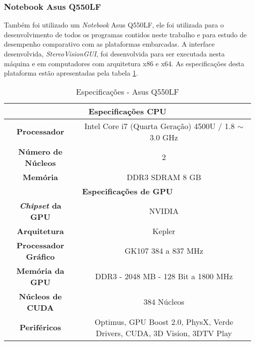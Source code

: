 \subsubsection{Notebook Asus Q550LF}

Também foi utilizado um \textit{Notebook} Asus Q550LF, ele foi utilizada para o desenvolvimento de todos os programas contidos neste trabalho e para estudo de desempenho comparativo com as plataformas embarcadas. A interface desenvolvida, \textit{StereoVisionGUI}, foi desenvolvida para ser executada nesta máquina e em computadores com arquitetura x86 e x64. As especificações desta plataforma estão apresentadas pela tabela \ref{asusQ550LF}.

\begin{table}[h]
\centering
\caption{Especificações - Asus Q550LF}
\label{asusQ550LF}
\begin{tabular}{|c|c|}
\hline
\multicolumn{2}{|c|}{\textbf{Especificações CPU}}                                                      		   \\ \hline
\textbf{Processador}             	& Intel Core i7 (Quarta Geração) 4500U / 1.8 $\sim$ 3.0 GHz           	   \\ \hline
\textbf{Número de Núcleos} 		& 2  	                                                                   \\ \hline
\textbf{Memória}          		& DDR3 SDRAM 8 GB                                                          \\ \hline
\multicolumn{2}{|c|}{\textbf{Especificações de GPU}}                                                   		   \\ \hline
\textbf{\textit{Chipset} da GPU}        & NVIDIA                                                      		   \\ \hline
\textbf{Arquitetura}    		& Kepler                                                                   \\ \hline
\textbf{Processador Gráfico}            & GK107 384 a 837 MHz                                         		   \\ \hline
\textbf{Memória da GPU}          	& DDR3 - 2048 MB - 128 Bit a 1800 MHz                                      \\ \hline
\textbf{Núcleos de CUDA}      		& 384 Núcleos                                                              \\ \hline
\textbf{Periféricos}        		& Optimus, GPU Boost 2.0, PhysX, Verde Drivers, CUDA, 3D Vision, 3DTV Play \\ \hline
\end{tabular}
\end{table}


